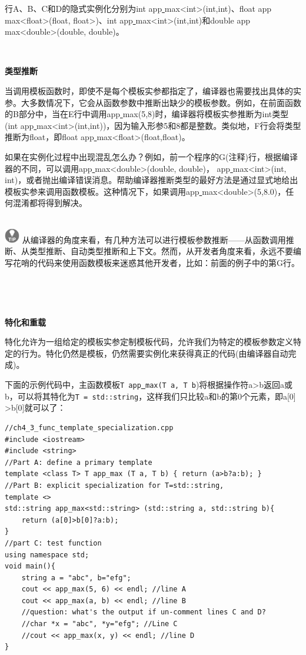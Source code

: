 行A、B、C和D的隐式实例化分别为int app\underline{ }max<int>(int,int)、float app\underline{ }max<float>(float, float>)、int app\underline{ }max<int>(int,int)和double app\underline{ }max<double>(double, double)。 \par

\noindent\textbf{}\ \par
\textbf{类型推断} \ \par
当调用模板函数时，即使不是每个模板实参都指定了，编译器也需要找出具体的实参。大多数情况下，它会从函数参数中推断出缺少的模板参数。例如，在前面函数的B部分中，当在E行中调用app\underline{ }max(5,8)时，编译器将模板实参推断为int类型(int app\underline{ }max<int>(int,int))，因为输入形参5和8都是整数。类似地，F行会将类型推断为float，即float app\underline{ }max<float>(float,float)。 \par
如果在实例化过程中出现混乱怎么办？例如，前一个程序的G(注释)行，根据编译器的不同，可以调用app\underline{ }max<double>(double, double)， app\underline{ }max<int>(int, int)，或者抛出编译错误消息。帮助编译器推断类型的最好方法是通过显式地给出模板实参来调用函数模板。这种情况下，如果调用app\underline{ }max<double>(5,8.0)，任何混淆都将得到解决。 \par

\hspace*{\fill} \\ %
\includegraphics[width=0.05\textwidth]{images/tip}
从编译器的角度来看，有几种方法可以进行模板参数推断——从函数调用推断、从类型推断、自动类型推断和上下文。然而，从开发者角度来看，永远不要编写花哨的代码来使用函数模板来迷惑其他开发者，比如：前面的例子中的第G行。\par
\noindent\textbf{}\ \par

\noindent\textbf{}\ \par
\textbf{特化和重载} \ \par
特化允许为一组给定的模板实参定制模板代码，允许我们为特定的模板参数定义特定的行为。特化仍然是模板，仍然需要实例化来获得真正的代码(由编译器自动完成)。\par
下面的示例代码中，主函数模板\texttt{T app\underline{ }max(T a, T b})将根据操作符a>b返回a或b，可以将其特化为\texttt{T = std::string}，这样我们只比较a和b的第0个元素，即a[0] >b[0]就可以了： \par

\begin{lstlisting}[caption={}]
//ch4_3_func_template_specialization.cpp
#include <iostream>
#include <string>
//Part A: define a primary template
template <class T> T app_max (T a, T b) { return (a>b?a:b); }
//Part B: explicit specialization for T=std::string,
template <>
std::string app_max<std::string> (std::string a, std::string b){
	return (a[0]>b[0]?a:b);
}
//part C: test function
using namespace std;
void main(){
	string a = "abc", b="efg";
	cout << app_max(5, 6) << endl; //line A
	cout << app_max(a, b) << endl; //line B
	//question: what's the output if un-comment lines C and D?
	//char *x = "abc", *y="efg"; //Line C
	//cout << app_max(x, y) << endl; //line D
}
\end{lstlisting}

